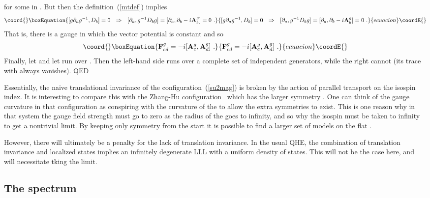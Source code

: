 \documentclass[a4paper,12pt]{article}
\providecommand{\R}{R}
\begin{document}
for some \coordHE{} in \coordHE{}.  But then the definition~(\ref{mtdef}) implies
\begin{equation}\coord{}\boxEquation{
[g \partial_a g^{-1}, D_b ] = 0\ \ \Rightarrow\ \ 
[\partial_a, g^{-1} D_b g ] = [\partial_a, \partial_b
- i {\bf
A}^{g}_b ] = 0\
.
}{
[g \partial_a g^{-1}, D_b ] = 0\ \ \Rightarrow\ \ 
[\partial_a, g^{-1} D_b g ] = [\partial_a, \partial_b
- i {\bf
A}^{g}_b ] = 0\
.
}{ecuacion}\coordE{}\end{equation}
That is, there is a gauge in which the vector potential \myHighlight{${\bf
A}^{g}_a$}\coordHE{} is constant and so
\begin{equation}\coord{}\boxEquation{
{\bf F}^g_{cd} =
- i [ {\bf A}^g_c, {\bf A}^g_d]\ .
}{
{\bf F}^g_{cd} =
- i [ {\bf A}^g_c, {\bf A}^g_d]\ .
}{ecuacion}\coordE{}\end{equation}
Finally, let \coordHE{} and let \coordHE{} run over \coordHE{}.  Then the
left-hand side runs over a complete set of independent \coordHE{} generators,
while the right cannot (its trace with \coordHE{} always vanishes).
QED

Essentially, the naive translational invariance of the
configuration~(\ref{su2mag}) is broken by the action of parallel transport
on the isospin index. 
It is interesting to compare this with the Zhang-Hu
configuration~\cite{hz1} which has the larger symmetry \coordHE{}.  One can
think of the gauge curvature in that configuration as conspiring with the
curvature of the
\myHighlight{$S^4$}\coordHE{} to allow the extra symmetries to exist.  This is one reason why in
that system the gauge field strength must go to zero as the radius of the
\myHighlight{$S^4$}\coordHE{} goes to infinity, and so why the isospin must be taken to infinity
to get a nontrivial limit.  By keeping only \coordHE{} symmetry from
the start it is possible to find a larger set of models on the flat \myHighlight{$\R^4$}\coordHE{}.

However, there will ultimately be a penalty for the lack of translation
invariance.  In the usual QHE, the combination of translation invariance and
localized states implies an infinitely degenerate LLL with a uniform density
of states.  This will not be the case here, and will necessitate tking the \myHighlight{$I
\to \infty$}\coordHE{} limit.


\subsection{The spectrum}
\end{document}
